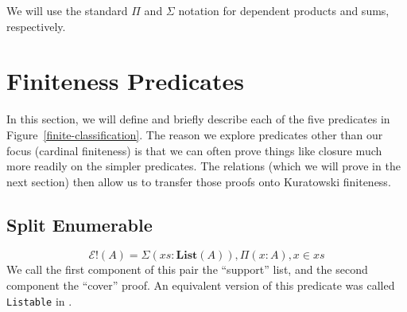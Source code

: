 

We will use the standard \(\Pi\) and \(\Sigma\) notation for dependent products
and sums, respectively.


\section{Finiteness Predicates}
In this section, we will define and briefly describe each of the five predicates
in Figure~\ref{finite-classification}.
The reason we explore predicates other than our focus (cardinal finiteness) is
that we can often prove things like closure much more readily on the simpler
predicates.
The relations (which we will prove in the next section) then allow us to
transfer those proofs onto Kuratowski finiteness.
\subsection{Split Enumerable}
\begin{romdefinition}
  \begin{equation}
    \mathcal{E}!(A) = \Sigma {(\mathit{xs} : \textbf{List}(A))} , \Pi {(x : A)} , x \in \mathit{xs}
  \end{equation}
  We call the first component of this pair the ``support'' list, and the second
  component the ``cover'' proof.
  An equivalent version of this predicate was called \verb+Listable+ in
  \cite{firsovDependentlyTypedProgramming2015}.
\end{romdefinition}

